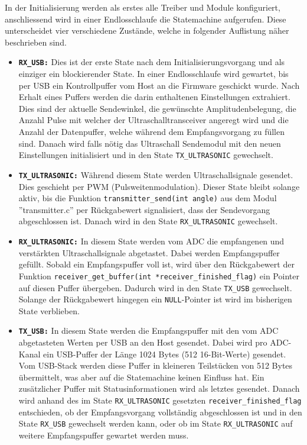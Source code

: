 In der Initialisierung werden als erstes alle Treiber und Module konfiguriert, anschliessend wird in einer Endlosschlaufe die Statemachine aufgerufen. Diese unterscheidet vier verschiedene Zustände, welche in folgender Auflistung näher beschrieben sind.

\begin{itemize}
	\item\textbf{\texttt{RX\_USB:}} Dies ist der erste State nach dem Initialisierungsvorgang und als einziger ein blockierender State. In einer Endlosschlaufe wird gewartet, bis per USB ein Kontrollpuffer vom Host an die Firmware geschickt wurde. Nach Erhalt eines Puffers werden die darin enthaltenen Einstellungen extrahiert. Dies sind der aktuelle Sendewinkel, die gewünschte Amplitudenbelegung, die Anzahl Pulse mit welcher der Ultraschalltransceiver angeregt wird und die Anzahl der Datenpuffer, welche während dem Empfangsvorgang zu füllen sind. Danach wird falls nötig das Ultraschall Sendemodul mit den neuen Einstellungen initialisiert und in den State \texttt{TX\_ULTRASONIC} gewechselt.

	\item\textbf{\texttt{TX\_ULTRASONIC:}} Während diesem State werden Ultraschallsignale gesendet. Dies geschieht per PWM (Pulsweitenmodulation). Dieser State bleibt solange aktiv, bis die Funktion \texttt{transmitter\_send(int angle)} aus dem Modul ''transmitter.c'' per Rückgabewert signalisiert, dass der Sendevorgang abgeschlossen ist. Danach wird in den State \texttt{RX\_ULTRASONIC} gewechselt.

	\item\textbf{\texttt{RX\_ULTRASONIC:}} In diesem State werden vom ADC die empfangenen und verstärkten Ultraschallsignale abgetastet. Dabei werden Empfangspuffer gefüllt. Sobald ein Empfangspuffer voll ist, wird über den Rückgabewert der Funktion \texttt{receiver\_get\_buffer(int *receiver\_finished\_flag)} ein Pointer auf diesen Puffer übergeben. Dadurch wird in den State \texttt{TX\_USB} gewechselt. Solange der Rückgabewert hingegen ein \texttt{NULL}-Pointer ist wird im bisherigen State verblieben.

	\item\textbf{\texttt{TX\_USB:}} In diesem State werden die Empfangspuffer mit den vom ADC abgetasteten Werten per USB an den Host gesendet. Dabei wird pro ADC-Kanal ein USB-Puffer der Länge 1024 Bytes (512 16-Bit-Werte) gesendet. Vom USB-Stack werden diese Puffer in kleineren Teilstücken von 512 Bytes übermittelt, was aber auf die Statemachine keinen Einfluss hat. Ein zusätzlicher Puffer mit Statusinformationen wird als letztes gesendet. Danach wird anhand des im State \texttt{RX\_ULTRASONIC} gesetzten \texttt{receiver\_finished\_flag} entschieden, ob der Empfangsvorgang vollständig abgeschlossen ist und in den State \texttt{RX\_USB} gewechselt werden kann, oder ob im State \texttt{RX\_ULTRASONIC} auf weitere Empfangspuffer gewartet werden muss.
\end{itemize}


